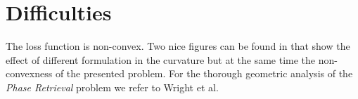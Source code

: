 \section{Difficulties}

The loss function is non-convex. Two nice figures can be found in \cite{bib:rfw-irwf} that show the effect of different formulation in the curvature 
but at the same time the non-convexness of the presented problem. For the thorough geometric analysis of the \emph{Phase Retrieval} problem 
we refer to Wright et al.\cite{bib:phase-geometric}   



































